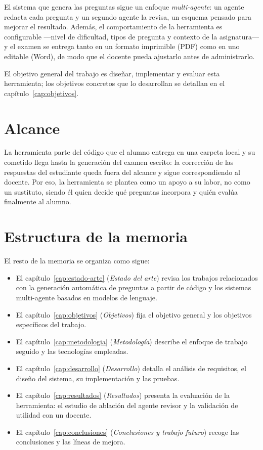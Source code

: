 El sistema que genera las preguntas sigue un enfoque \emph{multi-agente}: un
agente redacta cada pregunta y un segundo agente la revisa, un esquema pensado
para mejorar el resultado. Además, el comportamiento de la
herramienta es configurable ---nivel de dificultad, tipos de pregunta y contexto
de la asignatura--- y el examen se entrega tanto en un formato imprimible (PDF)
como en uno editable (Word), de modo que el docente pueda ajustarlo antes de
administrarlo.

El objetivo general del trabajo es diseñar, implementar y evaluar esta
herramienta; los objetivos concretos que lo desarrollan se detallan en el
capítulo~\ref{cap:objetivos}.


\section{Alcance}
\label{sec:intro-alcance}

La herramienta parte del código que el alumno entrega en una carpeta local y su
cometido llega hasta la generación del examen escrito: la corrección de las respuestas del estudiante queda fuera del
alcance y sigue correspondiendo al docente. Por eso, la
herramienta se plantea como un apoyo a su labor, no como un sustituto, siendo
él quien decide qué preguntas incorpora y quién evalúa finalmente al alumno.


\section{Estructura de la memoria}
\label{sec:intro-estructura}

El resto de la memoria se organiza como sigue:

\begin{itemize}
  \item El capítulo~\ref{cap:estado-arte} (\emph{Estado del arte}) revisa los
        trabajos relacionados con la generación automática de preguntas a partir
        de código y los sistemas multi-agente basados en modelos de lenguaje.
  \item El capítulo~\ref{cap:objetivos} (\emph{Objetivos}) fija el objetivo
        general y los objetivos específicos del trabajo.
  \item El capítulo~\ref{cap:metodologia} (\emph{Metodología}) describe el
        enfoque de trabajo seguido y las tecnologías empleadas.
  \item El capítulo~\ref{cap:desarrollo} (\emph{Desarrollo}) detalla el análisis
        de requisitos, el diseño del sistema, su implementación y las pruebas.
  \item El capítulo~\ref{cap:resultados} (\emph{Resultados}) presenta la
        evaluación de la herramienta: el estudio de ablación del agente revisor
        y la validación de utilidad con un docente.
  \item El capítulo~\ref{cap:conclusiones} (\emph{Conclusiones y trabajo futuro})
        recoge las conclusiones y las líneas de mejora.
\end{itemize}

